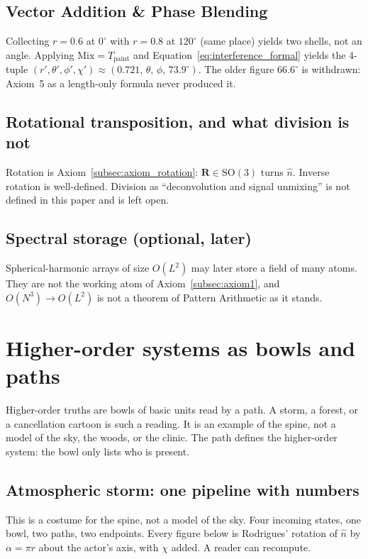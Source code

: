 \documentclass[12pt, a4paper]{article}
\begin{document}
\subsection{Vector Addition \& Phase Blending}
Collecting $r=0.6$ at $0^\circ$ with $r=0.8$ at $120^\circ$ (same
place) yields two shells, not an angle. Applying
$\mathrm{Mix}=T_{\mathrm{paint}}$ and
Equation~\eqref{eq:interference_formal} yields the 4-tuple
$(r',\theta',\phi',\chi')\approx(0.721,\,\theta,\,\phi,\,73.9^\circ)$.
The older figure $66.6^\circ$ is withdrawn: Axiom~5 as a length-only
formula never produced it.

\subsection{Rotational transposition, and what division is not}
Rotation is Axiom~\ref{subsec:axiom_rotation}: $\mathbf{R}\in\mathrm{SO}(3)$
turns $\hat n$. Inverse rotation is well-defined. Division as
``deconvolution and signal unmixing'' is not defined in this paper and
is left open.

\subsection{Spectral storage (optional, later)}
Spherical-harmonic arrays of size $O(L^2)$ may later store a field of
many atoms. They are not the working atom of
Axiom~\ref{subsec:axiom1}, and $O(N^3)\to O(L^2)$ is not a theorem of
Pattern Arithmetic as it stands.

\section{Higher-order systems as bowls and paths}
\label{sec:higher_order}
Higher-order truths are bowls of basic units read by a path.
A storm, a forest, or a cancellation cartoon is such a reading.
It is an example of the spine, not a model of the sky, the woods,
or the clinic. The path defines the higher-order system: the bowl
only lists who is present.

\subsection{Atmospheric storm: one pipeline with numbers}
\label{subsec:storm_pipeline}
This is a costume for the spine, not a model of the sky. Four incoming
states, one bowl, two paths, two endpoints. Every figure below is
Rodrigues' rotation of $\hat n$ by $\alpha=\pi r$ about the actor's
axis, with $\chi$ added. A reader can recompute.
\end{document}
